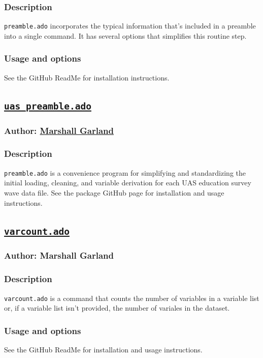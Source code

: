 \documentclass[11pt]{article}
\begin{document}
{\subsubsection{Description}
\texttt{preamble.ado} incorporates the typical information that's included in a preamble into a single command. It has several options that simplifies this routine step.
\subsubsection{Usage and options}
See the GitHub ReadMe for installation instructions.

\subsection{\href{https://github.com/usc-care/uas_preamble}{\texttt{uas\_preamble.ado}}}
\subsubsection{Author: \href{mailto:garlandm@usc.edu}{Marshall Garland}}
\subsubsection{Description}
\texttt{preamble.ado} is a convenience program for simplifying and standardizing the initial loading, cleaning, and variable derivation for each UAS education survey wave data file. See the package GitHub page for installation and usage instructions.

\subsection{\href{https://github.com/marshallwg/varcount}{\texttt{varcount.ado}}}
\subsubsection{Author: Marshall Garland}
\subsubsection{Description}
\texttt{varcount.ado} is a command that counts the number of variables in a variable list or, if a variable list isn't provided, the number of variales in the dataset.
\subsubsection{Usage and options}
See the GitHub ReadMe for installation and usage instructions.

}
\end{document}
